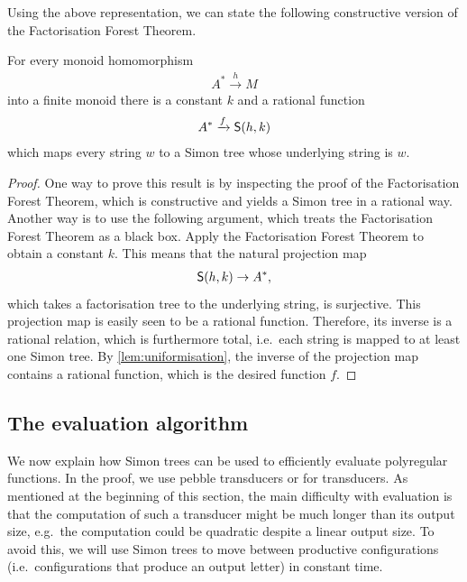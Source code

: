 Using the above representation, we can state the following constructive version of the Factorisation Forest Theorem.
\begin{lemma}\label{lem:factorisation-forest-rational}
    For every monoid homomorphism 
    \begin{align*}
    A^* \xrightarrow h M
    \end{align*}
    into a finite monoid 
    there is a constant $k$ and a rational function 
    \begin{align*}
    A^* \xrightarrow f \mathsf S(h,k)
    \end{align*}
   which maps every string $w$ to a Simon tree whose underlying string is $w$.
\end{lemma}
\begin{proof}
    One way to prove this result is by inspecting the proof of the Factorisation Forest Theorem, which is constructive and yields a Simon tree in a rational way. Another way is to use the following argument, which treats the Factorisation Forest Theorem as a black box.
    Apply the Factorisation Forest Theorem to obtain a constant $k$. This means that the natural projection map 
\begin{align*}\mathsf S(h,k) \to A^*,\end{align*}
which takes a factorisation tree to the underlying string, is surjective. This projection map is easily seen to be a rational function. Therefore, its inverse is a rational relation, which is furthermore total, i.e.~each string is mapped to at least one Simon tree. By \cref{lem:uniformisation}, the inverse of the projection map contains a rational function, which is the desired function $f$.
\end{proof}

\subsection{The evaluation algorithm}
\label{sec:evaluation-algorithm}
We now explain how Simon trees can be used to efficiently evaluate polyregular functions. In the proof, we use pebble transducers or for transducers.  As mentioned at the beginning of this section, the main difficulty with evaluation is that the computation of such a transducer might be much longer than its output size, e.g.~the computation could be quadratic despite a linear output size. To avoid this, we will use Simon trees to move between productive configurations (i.e.~configurations that produce an output letter) in constant time. 


